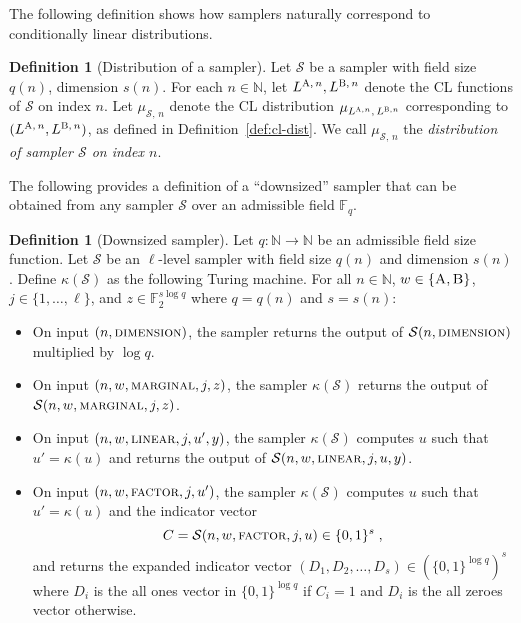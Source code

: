 \documentclass[11pt]{article}
\theoremstyle{definition}
\newtheorem{definition}[theorem]{Definition}
\newcommand{\N}{\ensuremath{\mathbb{N}}}
\newcommand{\F}{\ensuremath{\mathbb{F}}}
\newcommand{\downsize}{\kappa}
\newcommand{\sampler}{\mathcal{S}}
\newcommand{\gamestyle}[1]{\ensuremath{\textsc{#1}}\xspace}
\newcommand{\labelstyle}[1]{\ensuremath{\textsc{#1}}\xspace}
\newcommand{\alice}{\labelstyle{A}}
\newcommand{\bob}{\labelstyle{B}}
\begin{document}
The following definition shows how samplers naturally correspond to
conditionally linear distributions.
\begin{definition}[Distribution of a sampler]
  \label{def:sampler-sample}
  Let $\sampler$ be a sampler with field size $q(n)$, dimension $s(n)$.
  For each $n \in \N$, let $L^{\alice,\, n}, L^{\bob,\, n}$ denote the CL
  functions of $\sampler$ on index $n$.
  Let $\mu_{\sampler,\, n}$ denote the CL distribution $\mu_{L^{\alice, n},\,
    L^{\bob, n}}$ corresponding to $(L^{\alice,\, n}, L^{\bob,\, n})$, as defined in Definition~\ref{def:cl-dist}.
  We call $\mu_{\sampler,\, n}$ the \emph{distribution of sampler $\sampler$ on
    index $n$}.
\end{definition}

The following provides a definition of a ``downsized'' sampler that can be
obtained from any sampler $\sampler$ over an admissible field $\F_q$.
\begin{definition}[Downsized sampler]
  \label{def:downsize_sampler}
	Let $q: \N \to \N$ be an admissible field size function.
  Let $\sampler$ be an $\ell$-level sampler with field size $q(n)$ and dimension
  $s(n)$.
  Define $\downsize(\sampler)$ as the following Turing machine.
  For all $n \in \N$, $w \in \{\alice,\bob\}$, $j \in \{1,\ldots,\ell\}$, and $z
  \in \F_2^{s \log q}$ where $q = q(n)$ and $s = s(n)$:
	\begin{itemize}
  \item On input $(n, \gamestyle{dimension})$, the sampler returns the output of
    $\sampler(n, \gamestyle{dimension})$ multiplied by $\log q$.
		
	\item On input $(n, w, \gamestyle{marginal}, j, z)$, the sampler
    $\downsize(\sampler)$ returns the output of $\sampler(n, w,
    \gamestyle{marginal}, j, z)$.
		
			 \item On input $(n, w, \gamestyle{linear}, j, u', y)$, the sampler  $\downsize(\sampler)$  computes $u$ such that $u' = \downsize(u)$ and returns the output of $\sampler(n, w, \gamestyle{linear}, j, u, y)$.
		
	\item On input $(n, w, \gamestyle{factor}, j, u')$, the sampler
    $\downsize(\sampler)$ computes $u$ such that $u' = \downsize(u)$ and the
    indicator vector
    \[
      C = \sampler(n, w, \gamestyle{factor}, j, u) \in \{0,1\}^s\;,
    \]
    and returns the expanded indicator vector $(D_1, D_2, \ldots, D_s) \in (\{0,
    1\}^{\log q})^s$ where $D_i$ is the all ones vector in $\{0, 1\}^{\log q}$
    if $C_i = 1$ and $D_i$ is the all zeroes vector otherwise.
  \end{itemize}
\end{definition}
\end{document}
